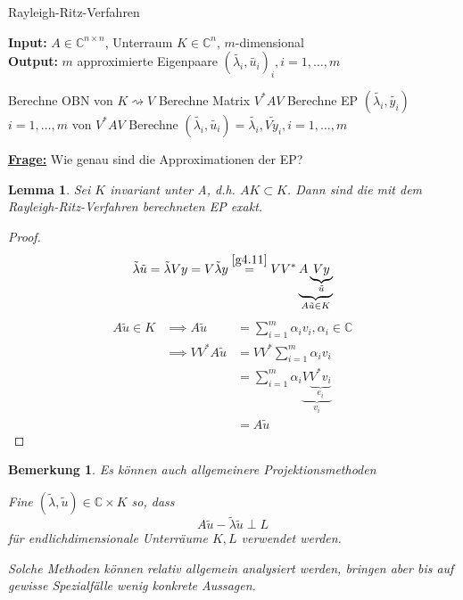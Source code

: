 \documentclass{book}
\newtheorem{lemma}[algorithm]{Lemma}
\newtheorem{remark}[algorithm]{Bemerkung}
\def\C{\mathbb{C}}
\begin{document}
            \begin{algorithm}[H]
                     \caption{Rayleigh-Ritz-Verfahren}\label{a4.32}
                  \textbf{Input:} $A\in\C^{n\times n}$, Unterraum $K\in\C^n$, $m$-dimensional\\
                  \textbf{Output:} $m$ approximierte Eigenpaare $(\tilde{\lambda_i},\tilde{u_i})_i,i=1,\dots,m$
                  \begin{algorithmic}
                    \State Berechne OBN von $K \rightsquigarrow V$
                    \State Berechne Matrix $V^*AV$
                    \State Berechne EP $(\tilde{\lambda_i},\tilde{y_i})$ $i=1,\dots,m$ von $V^*AV$
                    \State Berechne $(\tilde{\lambda_i},\tilde{u_i})=\tilde{\lambda_i},\tilde{Vy_i}, i=1,\dots,m$
                  \end{algorithmic}
               \end{algorithm}
            
            \underline{\textbf{Frage:}} Wie genau sind die Approximationen der EP?

            \begin{lemma}\label{l4.33}
                Sei $K$ invariant unter A, d.h. $AK\subset K$. Dann sind die mit dem Rayleigh-Ritz-Verfahren berechneten EP exakt.
            \end{lemma}

            \begin{proof}
                \begin{align*}
                    \tilde{\lambda}\tilde{u}=\tilde{\lambda} Vy=V\tilde{\lambda}y\stackrel{\ref{g4.11}}{=}VV^*\underbrace{A\underbrace{Vy}_{\tilde{u}}}_{A\tilde{u}\in K}
                \end{align*}
                \begin{align*}
                    A\tilde{u}\in K&\implies A\tilde{u}&=\sum_{i=1}^m\alpha_iv_i,\alpha_i\in\C\\
                    &\implies VV^*A\tilde{u}&=VV^*\sum_{i=1}^m\alpha_iv_i \\
                    &&=\sum_{i=1}^m\alpha_i\underbrace{V\underbrace{V^*v_i}_{e_i}}_{v_i}\\
                    &&=A\tilde{u}
                \end{align*}
            \end{proof}

            \begin{remark}\label{b4.34}
                Es können auch allgemeinere Projektionsmethoden

                Fine $(\tilde{\lambda},\tilde{u})\in\C\times K$ so, dass 
                \begin{equation*}
                    A\tilde{u}-\tilde{\lambda}\tilde{u}\perp L
                \end{equation*}
                für endlichdimensionale Unterräume $K,L$ verwendet werden.

                Solche Methoden können relativ allgemein analysiert werden, bringen aber bis auf gewisse Spezialfälle wenig 
                konkrete Aussagen.
            \end{remark}
\end{document}
